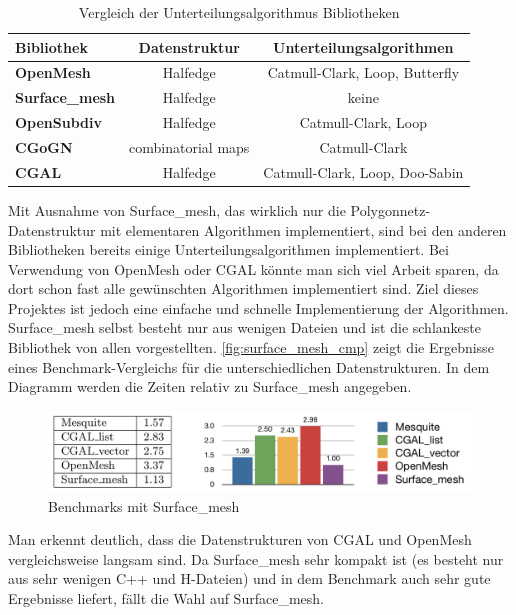 \begin{table}
\center
\caption{Vergleich der Unterteilungsalgorithmus Bibliotheken}
\begin{tabular}{l|c|c}
\textbf{Bibliothek} & \textbf{Datenstruktur} & \textbf{Unterteilungsalgorithmen}\\
\hline
\textbf{OpenMesh} & Halfedge & Catmull-Clark, Loop, Butterfly\\
\textbf{Surface\_mesh} & Halfedge & keine\\
\textbf{OpenSubdiv} & Halfedge & Catmull-Clark, Loop\\
\textbf{CGoGN} & combinatorial maps & Catmull-Clark\\
\textbf{\ac{CGAL}} & Halfedge & Catmull-Clark, Loop, Doo-Sabin\\
\end{tabular}
\label{tab:sd_bib}
\end{table}

Mit Ausnahme von Surface\_mesh, das wirklich nur die Polygonnetz-Datenstruktur mit elementaren Algorithmen implementiert, sind bei den anderen Bibliotheken bereits
einige Unterteilungsalgorithmen implementiert.
Bei Verwendung von OpenMesh oder CGAL könnte man sich viel Arbeit sparen, da dort schon fast alle gewünschten Algorithmen implementiert sind.
Ziel dieses Projektes ist jedoch eine einfache und schnelle Implementierung der Algorithmen.
Surface\_mesh selbst besteht nur aus wenigen Dateien und ist die schlankeste Bibliothek von allen vorgestellten.
\autoref{fig:surface_mesh_cmp} zeigt die Ergebnisse eines Benchmark-Vergleichs für die unterschiedlichen Datenstrukturen.
In dem Diagramm werden die Zeiten relativ zu Surface\_mesh angegeben.

\begin{figure}
  \centering
  \includegraphics[width=1.0\textwidth]{content/media/surface_mesh_cmp}
   \caption{Benchmarks mit Surface\_mesh \cite{Sieger.}}
  \label{fig:surface_mesh_cmp}
\end{figure}

Man erkennt deutlich, dass die Datenstrukturen von \ac{CGAL} und OpenMesh vergleichsweise langsam sind.
Da Surface\_mesh sehr kompakt ist (es besteht nur aus sehr wenigen C++ und H-Dateien) und in dem Benchmark auch sehr gute Ergebnisse liefert, fällt die Wahl auf Surface\_mesh.



